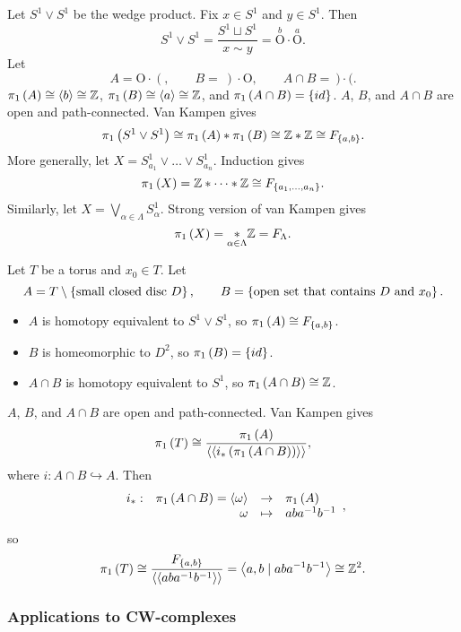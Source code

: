 \begin{example*}
Let $ S^1 \vee S^1 $ be the wedge product. Fix $ x \in S^1 $ and $ y \in S^1 $. Then
$$ S^1 \vee S^1 = \dfrac{S^1 \sqcup S^1}{x \sim y} = \overset{b}{\text{O}}\cdot\overset{a}{\text{O}}. $$
Let
$$ A = \text{O}\cdot(, \qquad B = \ )\cdot\text{O}, \qquad A \cap B = \ )\cdot(. $$
$ \pi_1\left( A \right) \cong \left\langle b \right\rangle \cong \mathbb{Z} $, $ \pi_1\left( B \right) \cong \left\langle a \right\rangle \cong \mathbb{Z} $, and $ \pi_1\left( A \cap B \right) = \left\{ id \right\} $. $ A $, $ B $, and $ A \cap B $ are open and path-connected. Van Kampen gives
$$ \pi_1\left( S^1 \vee S^1 \right) \cong \pi_1\left( A \right) * \pi_1\left( B \right) \cong \mathbb{Z} * \mathbb{Z} \cong F_{\left\{ a, b \right\}}. $$
More generally, let $ X = S_{a_1}^1 \vee \dots \vee S_{a_n}^1 $. Induction gives
$$ \pi_1\left( X \right) = \mathbb{Z} * \dots * \mathbb{Z} \cong F_{\left\{ a_1, \dots, a_n \right\}}. $$
Similarly, let $ X = \bigvee_{\alpha \in \Lambda} S_\alpha^1 $. Strong version of van Kampen gives
$$ \pi_1\left( X \right) = \underset{\alpha \in \Lambda}{*} \mathbb{Z} = F_\Lambda. $$
\end{example*}

\begin{example*}
Let $ T $ be a torus and $ x_0 \in T $. Let
$$ A = T \setminus \cb{\text{small closed disc} \ D}, \qquad B = \cb{\text{open set that contains} \ D \ \text{and} \ x_0}. $$
\begin{itemize}
\item $ A $ is homotopy equivalent to $ S^1 \vee S^1 $, so $ \pi_1\left( A \right) \cong F_{\left\{ a, b \right\}} $.
\item $ B $ is homeomorphic to $ D^2 $, so $ \pi_1\left( B \right) = \left\{ id \right\} $.
\item $ A \cap B $ is homotopy equivalent to $ S^1 $, so $ \pi_1\left( A \cap B \right) \cong \mathbb{Z} $.
\end{itemize}
$ A $, $ B $, and $ A \cap B $ are open and path-connected. Van Kampen gives
$$ \pi_1\left( T \right) \cong \dfrac{\pi_1\left( A \right)}{\left\langle \left\langle i_*\left( \pi_1\left( A \cap B \right) \right) \right\rangle \right\rangle}, $$
where $ i : A \cap B \hookrightarrow A $. Then
$$ \function[i_*]{\pi_1\rb{A \cap B} = \ab{\omega}}{\pi_1\rb{A}}{\omega}{aba^{-1}b^{-1}}, $$
so
$$ \pi_1\left( T \right) \cong \dfrac{F_{\left\{ a, b \right\}}}{\left\langle \left\langle aba^{-1}b^{-1} \right\rangle \right\rangle} = \left\langle a, b \mid aba^{-1}b^{-1} \right\rangle \cong \mathbb{Z}^2. $$
\end{example*}

\pagebreak

\subsubsection{Applications to CW-complexes}

